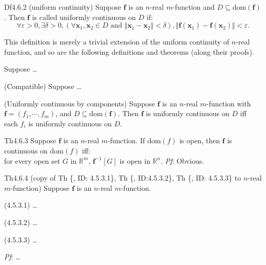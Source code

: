 \documentclass{article}
\begin{document}
\begin{Df}{Df4.6.2 (uniform continuity)}
    Suppose $\pmb{f}$ is an $n$-real $m$-function and $D\subseteq\text{dom}(\pmb{f})$. Then $\pmb{f}$ is called uniformly continuous on $D$ if:
    $$\forall\varepsilon>0, \exists\delta>0, \left(\forall \pmb{x}_1, \pmb{x}_2\in D\text{ and } \Vert\pmb{x}_1-\pmb{x}_2\Vert <\delta\right), \Vert\pmb{f}(\pmb{x}_1)-\pmb{f}(\pmb{x}_2)\Vert<\varepsilon.$$
\end{Df}

\begin{Rmk}{}
    This definition is merely a trivial extension of the uniform continuity of $n$-real function, and so are the following definitions and theorems (along their proofs).
    \begin{compactenum}
        \item \textcolor{Th}{Suppose \dots}
        \item \textcolor{Th}{(Compatible) Suppose \dots}
        \item \textcolor{Th}{(Uniformly continuous by components) Suppose $\pmb{f}$ is an $n$-real $m$-function with $\pmb{f} = (f_1, \cdots, f_m)$, and $D\subseteq\text{dom}(\pmb{f})$. Then $\pmb{f}$ is uniformly continuous on $D$ iff each $f_i$ is uniformly continuous on $D$.}
    \end{compactenum}
\end{Rmk}

\begin{Th}{Th4.6.3}
    Suppose $\pmb{f}$ is an $n$-real $m$-function. If $\text{dom}(f)$ is open, then $\pmb{f}$ is continuous on $\text{dom}(f)$ iff: \\
    for every open set $G$ in $\mathbb{R}^m$, $\pmb{f}^{-1}[G]$ is open in $\mathbb{R}^n$.
    \tcblower
    \textit{Pf}: Obvious.
\end{Th}

\begin{Th}{Th4.6.4 (copy of Th \{, ID: 4.5.3.1\}, Th \{, ID:4.5.3.2\}, Th \{, ID: 4.5.3.3\} to $n$-real $m$-function)}
    Suppose $\pmb{f}$ is an $n$-real $m$-function. 
    \begin{compactenum}
        \item (4.5.3.1) \dots
        \item (4.5.3.2) \dots
        \item (4.5.3.3) \dots
    \end{compactenum}
    \tcblower
    \textit{Pf}: \dots
\end{Th}
\end{document}
